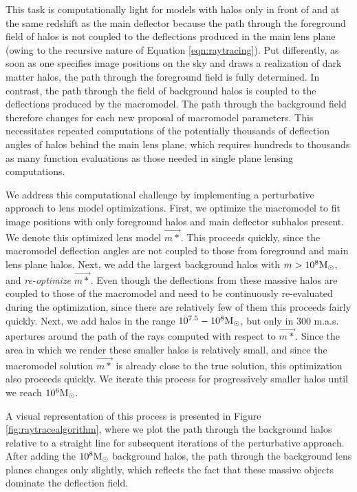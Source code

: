 This task is computationally light for models with halos only in front of and at the same redshift as the main deflector because the path through the foreground field of halos is not coupled to the deflections produced in the main lens plane (owing to the recursive nature of Equation \ref{eqn:raytracing}). Put differently, as soon as one specifies image positions on the sky and draws a realization of dark matter halos, the path through the foreground field is fully determined. In contrast, the path through the field of background halos is coupled to the deflections produced by the macromodel. The path through the background field therefore changes for each new proposal of macromodel parameters. This necessitates repeated computations of the potentially thousands of deflection angles of halos behind the main lens plane, which requires hundreds to thousands as many function evaluations as those needed in single plane lensing computations.

We address this computational challenge by implementing a perturbative approach to lens model optimizations. First, we optimize the macromodel to fit image positions with only foreground halos and main deflector subhalos present. We denote this optimized lens model $\vec{m*}$. This proceeds quickly, since the macromodel deflection angles are not coupled to those from foreground and main lens plane halos. Next, we add the largest background halos with $m>10^8 {\rm{M}_{\odot}}$, and {\textit{re-optimize}} $\vec{m*}$. Even though the deflections from these massive halos are coupled to those of the macromodel and need to be continuously re-evaluated during the optimization, since there are relatively few of them this proceeds fairly quickly. Next, we add halos in the range $10^{7.5} - 10^8 {\rm{M}_{\odot}}$, but only in 300 m.a.s. apertures around the path of the rays computed with respect to $\vec{m*}$. Since the area in which we render these smaller halos is relatively small, and since the macromodel solution $\vec{m*}$ is already close to the true solution, this optimization also proceeds quickly. We iterate this process for progressively smaller halos until we reach $10^6 {\rm{M}_{\odot}}$. 

A visual representation of this process is presented in Figure \ref{fig:raytracealgorithm}, where we plot the path through the background halos relative to a straight line for subsequent iterations of the perturbative approach. After adding the $10^8 {\rm{M}_{\odot}}$ background halos, the path through the background lens planes changes only slightly, which reflects the fact that these massive objects dominate the deflection field. 

